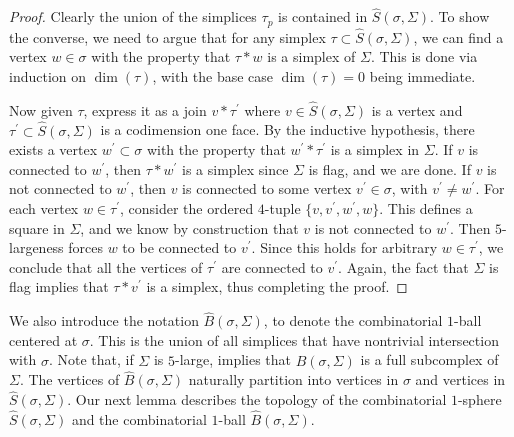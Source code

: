\documentclass[12pt, letterpaper]{article}
\theoremstyle{plain}
\theoremstyle{definition}
\begin{document}
\begin{proof}
Clearly the union of the simplices $\tau_p$ is contained in $\hat S(\sigma, \Sigma)$. To show the converse, we need to argue that for any simplex $\tau \subset \hat S(\sigma, \Sigma)$, we can find a vertex $w \in \sigma$ with the property that $\tau*w$ is a simplex of $\Sigma$. This is done via induction on $\dim(\tau)$, with the base case $\dim(\tau)=0$ being immediate.

Now given $\tau$, express it as a join $v * \tau^\prime$ where $v\in \hat S(\sigma, \Sigma)$ is a vertex and $\tau^\prime \subset \hat S(\sigma, \Sigma)$ is a codimension one face. By the inductive hypothesis, there exists a vertex $w^\prime \subset \sigma$ with the property that $w^\prime * \tau^\prime$ is a simplex in $\Sigma$. If $v$ is connected to $w^\prime$, then $\tau*w^\prime$ is a simplex since $\Sigma$ is flag, and we are done. If $v$ is not connected to $w^\prime$, then $v$ is connected to some vertex $v^\prime\in \sigma$, with $v^\prime\neq w^\prime$. For each vertex $w\in \tau^\prime$, consider the ordered $4$-tuple $\{v, v^\prime, w^\prime, w\}$. This defines a square in $\Sigma$, and we know by construction that $v$ is not connected to $w^\prime$. Then $5$-largeness forces $w$ to be connected to $v^\prime$. Since this holds for arbitrary $w \in \tau^\prime$, we conclude that all the vertices of $\tau^\prime$ are connected to $v^\prime$. Again, the fact that $\Sigma$ is flag implies that $\tau * v^\prime$ is a simplex, thus completing the proof.
\end{proof}

We also introduce the notation $\hat B(\sigma, \Sigma)$, to denote the combinatorial $1$-ball centered at $\sigma$. This is the union of all simplices that have nontrivial intersection with $\sigma$. Note that, if $\Sigma$ is $5$-large,  implies that $\hat B(\sigma, \Sigma)$ is a full subcomplex of $\Sigma$. The vertices of $\hat B(\sigma, \Sigma)$ naturally partition into vertices in $\sigma$ and vertices in $\hat S(\sigma, \Sigma)$. Our next lemma describes the topology of the combinatorial $1$-sphere $\hat S(\sigma, \Sigma)$ and the combinatorial $1$-ball $\hat B(\sigma, \Sigma)$.
\end{document}

